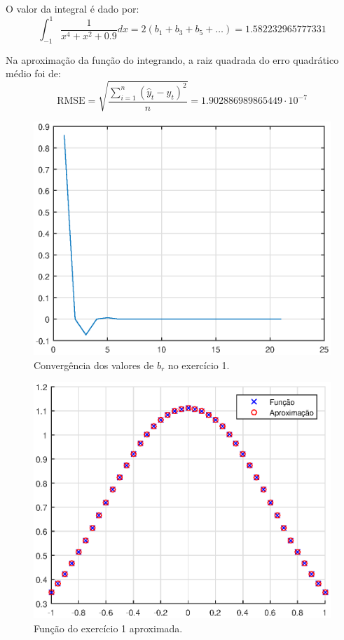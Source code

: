 \documentclass[10pt,a4paper]{article}
\begin{document}
    O valor da integral é dado por:
    	\[\int_{-1}^1 \frac{1}{x^4+x^2+0.9} dx = 2\left(b_1+b_3+b_5+\dots\right)=1.582232965777331\]
        
       Na aproximação da função do integrando, a raiz quadrada do erro quadrático médio foi de:
       \[\mbox{RMSE} = \sqrt{\frac{\sum_{i=1}^n\left(\hat{y}_t-y_t\right)^2}{n}} = 1.902886989865449\cdot 10^{-7}\]
    
    
    \begin{figure}
    	\centering
      \includegraphics[width=0.8\linewidth]{figures/f1.eps}
      \caption{Convergência dos valores de $b_r$ no exercício 1.}
      \label{fig:f1br}
	\end{figure}
    
    \begin{figure}
    \centering
      \includegraphics[width=0.8\linewidth]{figures/ap1.eps}
      \caption{Função do exercício 1 aproximada.}
      \label{fig:ap1br}
	\end{figure}
    
\end{document}
